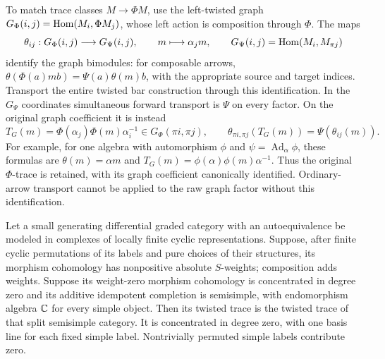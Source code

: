 To match trace classes $M\to\Phi M$, use the left-twisted graph
$G_\Phi(i,j)=\operatorname{Hom}(M_i,\Phi M_j)$, whose left action is
composition through $\Phi$.  The maps
\begin{equation}\label{tr:graph-identification}
 \theta_{ij}:G_\Phi(i,j)\longrightarrow G_\Psi(i,j),
 \qquad m\longmapsto\alpha_j m,
 \qquad G_\Psi(i,j)=\operatorname{Hom}(M_i,M_{\pi j})
\end{equation}
identify the graph bimodules: for composable arrows,
$\theta(\Phi(a)mb)=\Psi(a)\theta(m)b$, with the appropriate
source and target indices.  Transport the entire twisted bar
construction through this identification.  In the $G_\Psi$
coordinates simultaneous forward transport is $\Psi$ on every
factor.  On the original graph coefficient it is instead
\begin{equation}\label{tr:graph-transport}
 T_G(m)=\Phi(\alpha_j)\Phi(m)\alpha_i^{-1}
          \in G_\Phi(\pi i,\pi j),
 \qquad
 \theta_{\pi i,\pi j}(T_G(m))=\Psi(\theta_{ij}(m)).
\end{equation}
For example, for one algebra with automorphism $\phi$ and
$\psi=\operatorname{Ad}_\alpha\phi$, these formulas are
$\theta(m)=\alpha m$ and
$T_G(m)=\phi(\alpha)\phi(m)\alpha^{-1}$.
Thus the original $\Phi$-trace is retained, with its graph coefficient
canonically identified.  Ordinary-arrow transport cannot be applied
to the raw graph factor without this identification.

\begin{lemma}\label{tr:bar-contraction}
Let a small generating differential graded category with an
autoequivalence be modeled in complexes of locally finite cyclic
representations.  Suppose, after finite cyclic permutations of its
labels and pure choices of their structures, its morphism cohomology
has nonpositive absolute $S$-weights; composition adds weights.
Suppose its weight-zero morphism cohomology is concentrated in degree
zero and its additive idempotent completion is semisimple, with
endomorphism algebra $\mathbb C$ for every simple object.  Then its twisted
trace is the twisted trace of that split semisimple category.  It is concentrated in
degree zero, with one basis line for each fixed simple label.
Nontrivially permuted simple labels contribute zero.
\end{lemma}


